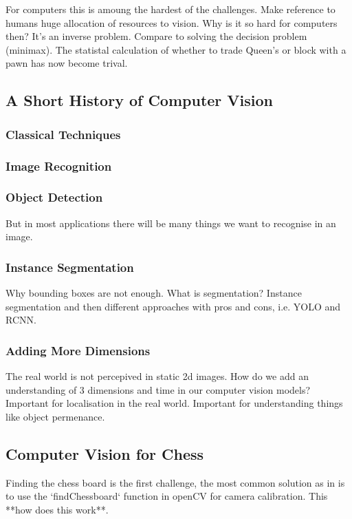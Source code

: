 For computers this is amoung the hardest of the challenges.  
Make reference to humans huge allocation of resources to vision. \cite{}
Why is it so hard for computers then? It's an inverse problem. 
Compare to solving the decision problem (minimax).  
The statistal calculation of whether to trade Queen's or block with a pawn has now become trival.  

\subsection{A Short History of Computer Vision}
\subsubsection{Classical Techniques}
\subsubsection{Image Recognition}
\subsubsection{Object Detection}
But in most applications there will be many things we want to recognise in an image.
\subsubsection{Instance Segmentation}
Why bounding boxes are not enough.  What is segmentation? Instance segmentation and then different approaches with pros and cons, i.e. YOLO and RCNN.
\subsubsection{Adding More Dimensions}
The real world is not percepived in static 2d images.  How do we add an understanding of 3 dimensions and time in our computer vision models?
Important for localisation in the real world.  Important for understanding things like object permenance.


\subsection{Computer Vision for Chess}
Finding the chess board is the first challenge, the most common solution as in \cite{} 
is to use the `findChessboard` function in openCV for camera calibration.  This **how does 
this work**.  